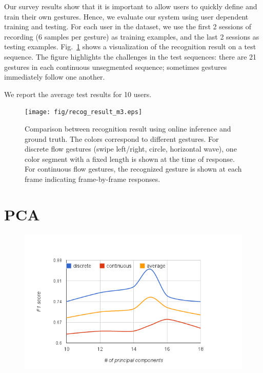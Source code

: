 Our survey results show that it is
important to allow users to quickly define and train their own gestures. Hence,
we evaluate our system using user dependent training and testing. For each user
in the dataset, we use the first 2 sessions of recording (6 samples per gesture)
as training examples, and the last 2 sessions as testing examples.
Fig.~\ref{fig:recog-result} shows a visualization of the recognition result on a
test sequence. The figure highlights the challenges in the test sequences:
there are 21 gestures in each continuous unsegmented sequence; sometimes
gestures immediately follow one another.

We report the average test results for 10 users.

\begin{figure}[t]
\centering
\texttt{[image: fig/recog\_result\_m3.eps]}
\caption{Comparison between recognition result using online inference
and ground truth.
The colors correspond to different gestures. For discrete flow gestures
(swipe left/right, circle, horizontal wave), one color segment with a fixed
length is shown at the time of response. For continuous flow gestures, the
recognized gesture is shown at each frame indicating frame-by-frame responses.}
\label{fig:recog-result}
\end{figure}

\section{PCA}
\begin{figure}[t]
\centering
\includegraphics[width=\columnwidth]{figures/f1_pca.png}
\end{figure}

